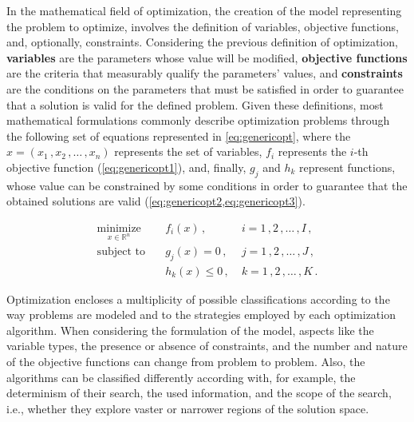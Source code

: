 	
	In the mathematical field of optimization, the creation of the model representing the problem to optimize, involves the definition of variables, objective functions, and, optionally, constraints. Considering the previous definition of optimization, \textbf{variables} are the parameters whose value will be modified, \textbf{objective functions} are the criteria that measurably qualify the parameters' values, and \textbf{constraints} are the conditions on the parameters that must be satisfied in order to guarantee that a solution is valid for the defined problem. Given these definitions, most mathematical formulations commonly describe optimization problems through the following set of equations represented in \cref{eq:genericopt}\cite{Koziel2011}, where the $x = (x_1\,, x_2\,, \ldots\,, x_n)$ represents the set of variables, $f_i$ represents the $i$-th objective function (\cref{eq:genericopt1}), and, finally, $g_j$ and $h_k$ represent functions, whose value can be constrained by some conditions in order to guarantee that the obtained solutions are valid (\cref{eq:genericopt2,eq:genericopt3}). 
	
	\begin{subequations}
		\label{eq:genericopt}
		\begin{align}
		\underset{x \in \mathbb{R}^n}{\text{minimize}}
		& \quad f_i(x)\,, &\; i = 1\,, 2\,, \ldots\,, I\,, 
		\label{eq:genericopt1}\\
		\text{subject to}
		& \quad g_j(x) = 0\,, &\; j = 1\,, 2\,, \ldots\,, J\,, \label{eq:genericopt2}\\ 
		& \quad h_k(x) \leq 0\,, &\; k = 1\,, 2\,, \ldots\,, K\,.  \label{eq:genericopt3}
		\end{align}
	\end{subequations}
	
	Optimization encloses a multiplicity of possible classifications according to the way problems are modeled and to the strategies employed by each optimization algorithm. When considering the formulation of the model, aspects like the variable types, the presence or absence of constraints, and the number and nature of the objective functions can change from problem to problem. Also, the algorithms can be classified differently according with, for example, the determinism of their search, the used information, and the scope of the search, i.e., whether they explore vaster or narrower regions of the solution space. 
	
